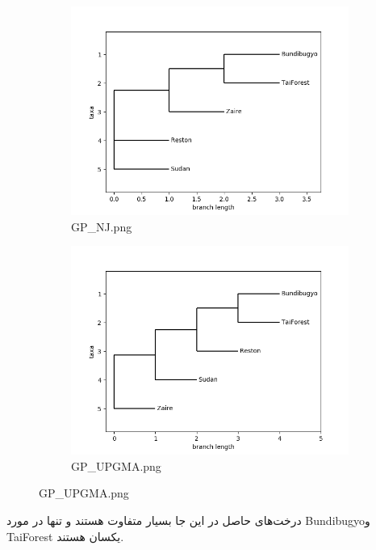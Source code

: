 \documentclass[11pt]{article}
\begin{document}
\begin{figure}[H]
  \centering
  \begin{subfigure}[b]{0.4\linewidth}
    \includegraphics[width=\linewidth]{../Data/Trees/GP_NJ.png}
    \caption{GP\_NJ.png}
  \end{subfigure}
  \begin{subfigure}[b]{0.4\linewidth}
    \includegraphics[width=\linewidth]{../Data/Trees/GP_UPGMA.png}
    \caption{GP\_UPGMA.png}
  \end{subfigure}
\end{figure}
درخت‌های حاصل در این جا بسیار متفاوت هستند و تنها در مورد Bundibugyoو TaiForest یکسان هستند.
\end{document}
